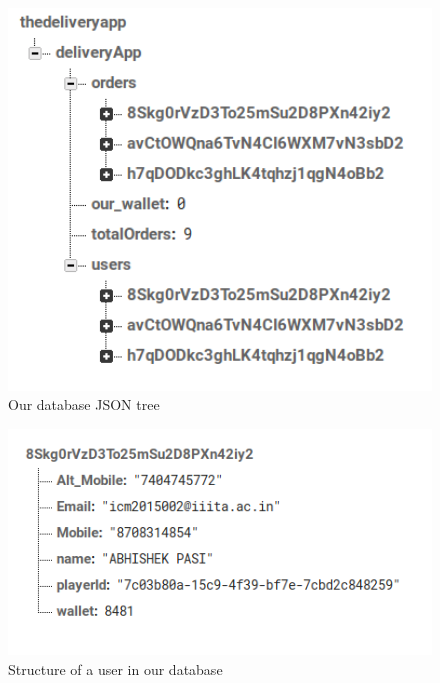 \documentclass{report}
\begin{document}
\begin{figure}[h!]
\includegraphics[width=14cm]{overall_tree.png}
\caption{Our database JSON tree}
\label{fig:NASA_Logo}
\end{figure}

\begin{figure}[h!]
\includegraphics[width=16cm]{user.png}
\caption{Structure of a user in our database}
\label{fig:NASA_Logo}
\end{figure}
\end{document}
